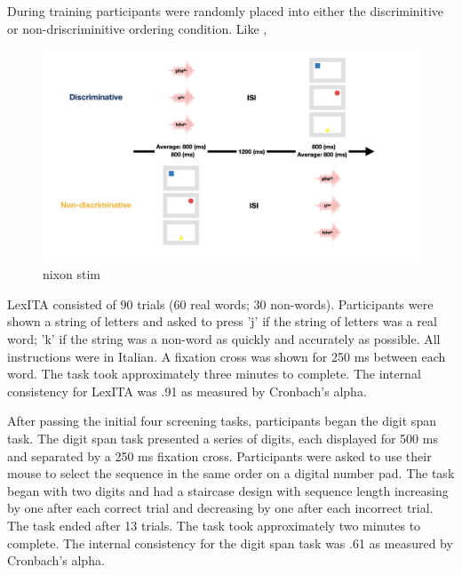 During training participants were randomly placed into either the discriminitive or non-driscriminitive ordering condition. Like \cite{nixon2020mice}, 


\begin{figure}[H]
  \centering
  \includegraphics[width=1\linewidth]{visualizations/visualizations/visualizations.006.jpeg}
  \caption{nixon stim}
  \label{fig:my_stim}
\end{figure}


LexITA  consisted of 90 trials (60 real words; 30 non-words). Participants were shown a string of letters and asked to press 'j' if the string of letters was a real word; 'k' if the string was a non-word as quickly and accurately as possible. All instructions were in Italian. A fixation cross was shown for 250 ms between each word. The task took approximately three minutes to complete. The internal consistency for LexITA was .91 as measured by Cronbach's alpha.

After passing the initial four screening tasks, participants began the digit span task. The digit span task presented a series of digits, each displayed for 500 ms and separated by a 250 ms fixation cross. Participants were asked to use their mouse to select the sequence in the same order on a digital number pad. The task began with two digits and had a staircase design with sequence length increasing by one after each correct trial and decreasing by one after each incorrect trial. The task ended after 13 trials. The task took approximately two minutes to complete. The internal consistency for the digit span task was .61 as measured by Cronbach's alpha.

